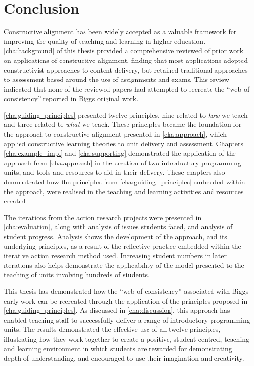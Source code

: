 
\chapter{Conclusion} %
\label{cha:conclusion}

Constructive alignment has been widely accepted as a valuable framework for improving the quality of teaching and learning in higher education. \cref{cha:background} of this thesis provided a comprehensive reviewed of prior work on applications of constructive alignment, finding that most applications adopted constructivist approaches to content delivery, but retained traditional approaches to assessment based around the use of assignments and exams. This review indicated that none of the reviewed papers had attempted to recreate the ``web of consistency'' reported in Biggs original work.

\cref{cha:guiding_principles} presented twelve principles, nine related to \emph{how} we teach and three related to \emph{what} we teach. These principles became the foundation for the approach to constructive alignment presented in \cref{cha:approach}, which applied constructive learning theories to unit delivery and assessment. Chapters \ref{cha:example_impl} and \ref{cha:supporting} demonstrated the application of the approach from \cref{cha:approach} in the creation of two introductory programming units, and tools and resources to aid in their delivery. These chapters also demonstrated how the principles from \cref{cha:guiding_principles} embedded within the approach, were realised in the teaching and learning activities and resources created.

The iterations from the action research projects were presented in \cref{cha:evaluation}, along with analysis of issues students faced, and analysis of student progress. Analysis shows the development of the approach, and its underlying principles, as a result of the reflective practice embedded within the iterative action research method used. Increasing student numbers in later iterations also helps demonstrate the applicability of the model presented to the teaching of units involving hundreds of students. 

This thesis has demonstrated how the ``web of consistency'' associated with Biggs early work can be recreated through the application of the principles proposed in \cref{cha:guiding_principles}. As discussed in \cref{cha:discussion}, this approach has enabled teaching staff to successfully deliver a range of introductory programming units. The results demonstrated the effective use of all twelve principles, illustrating how they work together to create a positive, student-centred, teaching and learning environment in which students are rewarded for demonstrating depth of understanding, and encouraged to use their imagination and creativity.

